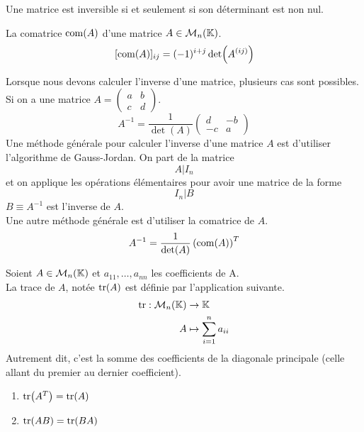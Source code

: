\begin{proposition}
	Une matrice est inversible si et seulement si son déterminant est non nul.
\end{proposition}

\begin{definition}[Comatrice]
	La comatrice $\operatorname{com}(A)$ d'une matrice $A \in \mathcal{M}_n(\mathbb{K})$.
	$$
	[\operatorname{com}(A)]_{ij} = (-1)^{i + j} \det(A^{(ij)}) 
	$$
\end{definition}

Lorsque nous devons calculer l'inverse d'une matrice, plusieurs cas sont possibles.
    Si on a une matrice
    $A =
    \begin{pmatrix}
        a & b \\
        c & d
    \end{pmatrix}
    $.
    \[
    A^{-1} = \frac{1}{\det(A)} 
    \begin{pmatrix}
        d & -b \\
        -c & a
    \end{pmatrix}
    \]
    Une méthode générale pour calculer l'inverse d'une matrice $A$ est d'utiliser l'algorithme de Gauss-Jordan.
    On part de la matrice 
    \[ A|I_n \]
    et on applique les opérations élémentaires pour avoir une matrice de la forme
    \[I_n|B\]
    $B \equiv A^{-1}$ est l'inverse de $A$.
    \\
    Une autre méthode générale est d'utiliser la comatrice de $A$.
    \[ A^{-1} = \frac{1}{\det(A)} \left( \operatorname{com}(A) \right)^T \]

\begin{definition}
	Soient $A \in \mathcal{M}_n(\mathbb{K})$ et $a_{11}, \ldots, a_{nn}$ les coefficients de A. 
	\\
	La trace de $A$, notée $\tr(A)$ est définie par l'application suivante.
	\begin{align*}
		\tr : \mathcal{M}_n(\mathbb{K}) &\to \mathbb{K} \\
		A &\mapsto \sum_{i = 1}^{n} a_{ii}
	\end{align*}
    Autrement dit, c'est la somme des coefficients de la diagonale principale (celle allant du premier au dernier coefficient).
\end{definition}

\begin{lemma}
	\begin{multicols}{2}
	    \begin{enumerate}
    		\item $\tr(A^T) = \tr(A)$
    		\item $\tr(A B) = \tr(B A)$
    	\end{enumerate}
	\end{multicols}
\end{lemma}

